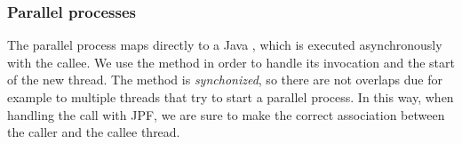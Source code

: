 
\subsubsection{Parallel processes}\label{sec:java-parallel}
The \coco parallel process maps directly to a Java
, which is executed asynchronously with the
callee. We use the method
 in order to handle its
invocation and the start of the new thread. The method is
\emph{synchonized}, so there are not overlaps due for example to
multiple threads that try to start a parallel process. In this way,
when handling the call with JPF, we are sure to make the correct
association between the caller and the callee thread.





